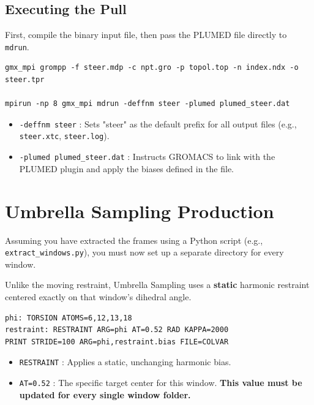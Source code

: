 \documentclass[12pt, a4paper]{article}
\begin{document}
\subsection{Executing the Pull}
First, compile the binary input file, then pass the PLUMED file directly to \texttt{mdrun}.

\begin{lstlisting}[title={\textbf{Bash Execution}}]
gmx_mpi grompp -f steer.mdp -c npt.gro -p topol.top -n index.ndx -o steer.tpr 

mpirun -np 8 gmx_mpi mdrun -deffnm steer -plumed plumed_steer.dat
\end{lstlisting}

\begin{syntaxbox}
\begin{itemize}
    \item \texttt{-deffnm steer} : Sets "steer" as the default prefix for all output files (e.g., \texttt{steer.xtc}, \texttt{steer.log}).
    \item \texttt{-plumed plumed\_steer.dat} : Instructs GROMACS to link with the PLUMED plugin and apply the biases defined in the file.
\end{itemize}
\end{syntaxbox}

\section{Umbrella Sampling Production}
Assuming you have extracted the frames using a Python script (e.g., \texttt{extract\_windows.py}), you must now set up a separate directory for every window.

Unlike the moving restraint, Umbrella Sampling uses a \textbf{static} harmonic restraint centered exactly on that window's dihedral angle.

\begin{lstlisting}[title={\textbf{plumed.dat (Inside window\_05/ )}}]
phi: TORSION ATOMS=6,12,13,18
restraint: RESTRAINT ARG=phi AT=0.52 RAD KAPPA=2000
PRINT STRIDE=100 ARG=phi,restraint.bias FILE=COLVAR
\end{lstlisting}

\begin{syntaxbox}
\begin{itemize}
    \item \texttt{RESTRAINT} : Applies a static, unchanging harmonic bias.
    \item \texttt{AT=0.52} : The specific target center for this window. \textbf{This value must be updated for every single window folder.}
\end{itemize}
\end{syntaxbox}
\end{document}
